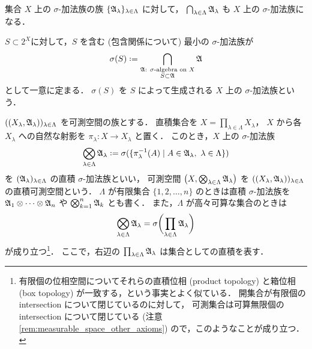 \begin{example}
    集合 $X$ 上の $\sigma$-加法族の族 $\{\mathfrak{A}_\lambda\}_{\lambda\in\Lambda}$ に対して，
        $\bigcap_{\lambda\in\Lambda}\mathfrak{A}_\lambda$
    も $X$ 上の $\sigma$-加法族になる．

    $S\subset 2^X$に対して，$S$ を含む (包含関係について) 最小の $\sigma$-加法族が
    \begin{align*}
        \sigma(S)\defeq\bigcap_{\substack{\text{$\Afrak$: $\sigma$-algebra on $X$}\\S\subset\Afrak}}\Afrak
    \end{align*}
    として一意に定まる．
    $\sigma(S)$ を $S$ によって生成される $X$ 上の $\sigma$-加法族という．
\end{example}

\begin{example}\label{ex:product_sigma_algebra}
    $((X_\lambda,\mathfrak{A}_\lambda))_{\lambda\in\Lambda}$ を可測空間の族とする．
    直積集合を $X=\prod_{\lambda\in\Lambda}X_\lambda$，
    $X$ から各 $X_\lambda$ への自然な射影を $\pi_\lambda:X\to X_\lambda$ と置く．
    このとき，$X$ 上の $\sigma$-加法族
    \begin{align*}
        \bigotimes_{\lambda\in\Lambda}\Afrak_\lambda
        \defeq\sigma(\{\pi_\lambda^{-1}(A)\mid A\in\Afrak_\lambda,\ \lambda\in\Lambda\})
    \end{align*}
    を $(\mathfrak{A}_\lambda)_{\lambda\in\Lambda}$ の直積 $\sigma$-加法族といい，
    可測空間 $\left(X,\bigotimes_{\lambda\in\Lambda}\mathfrak{A}_\lambda\right)$ を
    $((X_\lambda,\mathfrak{A}_\lambda))_{\lambda\in\Lambda}$ の直積可測空間という．
    $\Lambda$ が有限集合 $\{1,2,\ldots,n\}$ のときは直積 $\sigma$-加法族を
    $\mathfrak{A}_1\otimes\cdots\otimes\mathfrak{A}_n$ や $\bigotimes_{k=1}^n\mathfrak{A}_k$ とも書く．
    また，$\Lambda$ が高々可算な集合のときは
    \begin{align*}
        \bigotimes_{\lambda\in\Lambda}\mathfrak{A}_\lambda
        =\sigma\biggl(\prod_{\lambda\in\Lambda}\mathfrak{A}_\lambda\biggr)
    \end{align*}
    が成り立つ\footnote{
        有限個の位相空間についてそれらの直積位相 (product topology) と箱位相 (box topology) が一致する，という事実とよく似ている．
        開集合が有限個の intersection について閉じているのに対して，
        可測集合は可算無限個の intersection について閉じている (注意 \ref{rem:measurable_space_other_axioms})
        ので，このようなことが成り立つ．
    }．
    ここで，右辺の $\prod_{\lambda\in\Lambda}\mathfrak{A}_\lambda$ は集合としての直積を表す．
\end{example}

